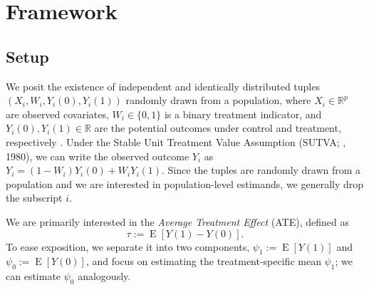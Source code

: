 \documentclass{article}
\theoremstyle{definition}
\newcommand{\R}{\ensuremath{\mathbb{R}}}
\DeclareMathOperator{\E}{E}
\newcommand{\<}{\langle}
\renewcommand{\>}{\rangle}
\begin{document}

\section{Framework}
\label{sec:framework}

\vspace{-.3cm}
\subsection{Setup}

We posit the existence of independent and identically distributed tuples $(X_i, W_i, Y_i(0), Y_i(1))$ randomly drawn from a population, where $X_i \in \R^p$ are observed covariates, $W_i \in \{0,1\}$ is a binary treatment indicator, and $Y_i(0), Y_i(1) \in \R$ are the potential outcomes under control and treatment, respectively \citep{neyman1923,rubin1974estimating}.
Under the Stable Unit Treatment Value Assumption (SUTVA; \citeauthor{rubin1980}, 1980), we can write the observed outcome $Y_i$ as $Y_i = (1-W_i)Y_i(0) + W_i Y_i(1)$.
Since the tuples are randomly drawn from a population and we are interested in population-level estimands, we generally drop the subscript $i$.

We are primarily interested in the {\it Average Treatment Effect} (ATE), defined as
\begin{equation}
  \label{eq:pate}
  \tau := \E[Y(1) - Y(0)].
\end{equation}
To ease exposition, we separate it into two components, $\psi_1 := \E[Y(1)]$ and $\psi_0 := \E[Y(0)]$, and focus on estimating the treatment-specific mean $\psi_1$; we can estimate $\psi_0$ analogously.
\end{document}
